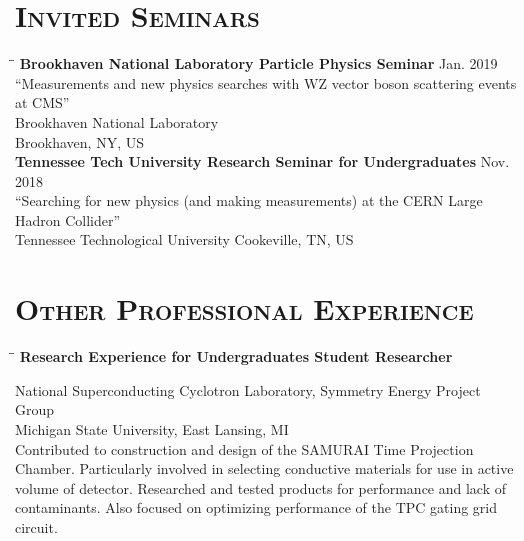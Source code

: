 \documentclass[10pt]{res} %
\begin{document}
\begin{resume}
\section{\textsc{Invited Seminars}}
\vspace{-0.1in}
\begin{tabbing}
\hspace{2.3in}\= \hspace{2.6in}\= \kill %
\textbf{Brookhaven National Laboratory Particle Physics Seminar} \>\> Jan. 2019\\ 
``Measurements and new physics searches with WZ vector boson scattering events at CMS'' \\
Brookhaven National Laboratory \\
Brookhaven, NY, US \\
\textbf{Tennessee Tech University Research Seminar for Undergraduates} \>\> Nov. 2018\\ 
``Searching for new physics (and making measurements) at the CERN Large Hadron Collider'' \\
Tennessee Technological University
Cookeville, TN, US \\
\end{tabbing}\vspace{-20pt}      %


\section{\textsc{Other Professional Experience}}
\vspace{-0.1in}
\begin{tabbing}
\hspace{2.3in}\= \hspace{2.5in}\= \kill %
  \textbf{Research Experience for Undergraduates Student Researcher} \>
\end{tabbing}\vspace{-20pt}      %
National Superconducting Cyclotron Laboratory, Symmetry Energy Project Group \\
Michigan State University, East Lansing, MI \\
Contributed to construction and design of the SAMURAI Time Projection Chamber. 
Particularly involved in selecting conductive materials for use in active 
volume of detector. Researched and tested products for performance and lack 
of contaminants. Also focused on optimizing performance of the TPC gating grid circuit.


\end{resume}
\end{document}
